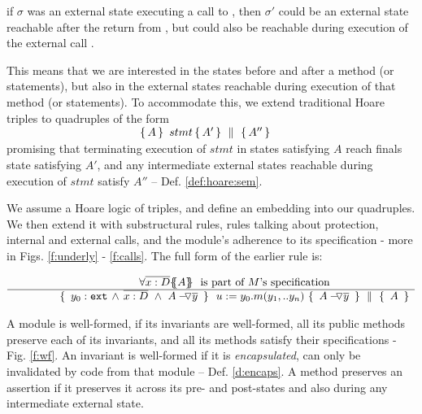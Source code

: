 {\Eg if $\sigma$ was an external state executing a call to , then $\sigma'$ could be an external state reachable 
after the return from , but could also be reachable
during execution of the external call .

This means that we are  interested in the states before and after a method (or statements), but  also  in the external states reachable during execution of that method (or statements).
To accommodate this, we extend   traditional Hoare triples to quadruples of the form\\
 $\strut \ \hspace{4cm} \quadruple {A} {\, stmt\, }{A'} {A''}$\\  
 promising that terminating execution of $stmt$ in  states satisfying $A$  reach    finals state satisfying $A'$, and any intermediate external states reachable during execution of $stmt$ satisfy    $A''$ -- \cf Def. \ref{def:hoare:sem}.

\vspace{.1cm}

We assume a  Hoare logic of  triples, and define an embedding into our quadruples. 
We then extend it with substructural rules, rules talking about protection, internal and external calls, 
and the module's adherence to its 
specification - more in Figs. \ref{f:underly} -  \ref{f:calls}. %
The full form of  the  earlier %
 rule %
 is:
 
 $\inferruleNoName  
 	{ 
   	   {\TwoStatesN {\overline {x:D}} {A}}\ \   \mbox{is part of $M$'s specification}
        }
	{   \quadruple { \    { \external{y_0}} \,     \wedge \,  \overline{x:D}\  \wedge\  {\PushAS {y}{A}}\ }  
						{ \ u:=y_0.m(y_1,.. y_n)\    }
						{ \    {\PushAS {y}{A}}  \ }
						{\  A  \ }
         }
$
 
 \vspace{.2cm}
A module is well-formed, if  its invariants are well-formed,  all  its public methods preserve each of its invariants, and  all its methods satisfy their specifications - \cf  Fig.  \ref{f:wf}.
%
An invariant is well-formed if %
it is \emph{encapsulated}, \ie can only be invalidated by code from that module -- \cf Def. \ref{d:encaps}. 
% 
A method preserves an assertion   if it preserves it across its pre- and post-states and also during any intermediate external state.

}
